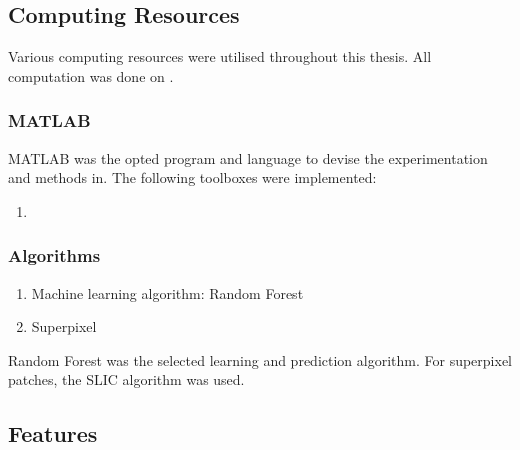 \subsection{Computing Resources}
Various computing resources were utilised throughout this thesis. All computation was done on .
\subsubsection{MATLAB}
MATLAB was the opted program and language to devise the experimentation and methods in. The following toolboxes were implemented:
\begin{enumerate}
	\item {}
\end{enumerate} 
\subsubsection{Algorithms}
\begin{enumerate}
	\item  Machine learning algorithm: Random Forest
	\item  Superpixel 
\end{enumerate}
Random Forest was the selected learning and prediction algorithm. For superpixel patches, the SLIC algorithm was used. 

\subsection{Features}

